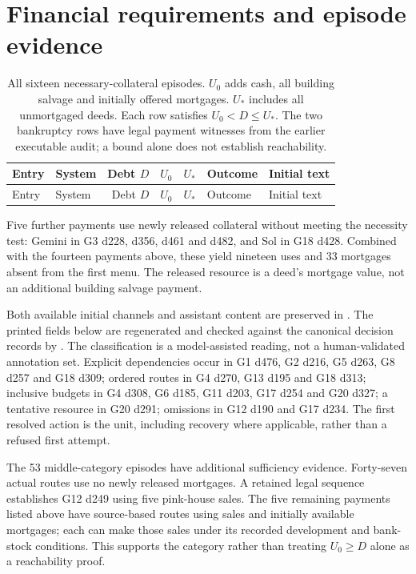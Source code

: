 \section{Financial requirements and episode evidence}
\label{app:finance}
\begin{longtable}{@{}llrrrll@{}}
\caption{All sixteen necessary-collateral episodes. $U_0$ adds cash, all building salvage and initially offered mortgages. $U_*$ includes all unmortgaged deeds. Each row satisfies $U_0<D\leq U_*$. The two bankruptcy rows have legal payment witnesses from the earlier executable audit; a bound alone does not establish reachability.}\label{tab:necessary}\\
\toprule Entry & System & Debt $D$ & $U_0$ & $U_*$ & Outcome & Initial text\\\midrule\endfirsthead
\toprule Entry & System & Debt $D$ & $U_0$ & $U_*$ & Outcome & Initial text\\\midrule\endhead

\end{longtable}

Five further payments use newly released collateral without meeting the necessity test: Gemini in G3 d228, d356, d461 and d482, and Sol in G18 d428. Combined with the fourteen payments above, these yield nineteen uses and 33 mortgages absent from the first menu. The released resource is a deed's mortgage value, not an additional building salvage payment.

Both available initial channels and assistant content are preserved in . The printed fields below are regenerated and checked against the canonical decision records by . The classification is a model-assisted reading, not a human-validated annotation set. Explicit dependencies occur in G1 d476, G2 d216, G5 d263, G8 d257 and G18 d309; ordered routes in G4 d270, G13 d195 and G18 d313; inclusive budgets in G4 d308, G6 d185, G11 d203, G17 d254 and G20 d327; a tentative resource in G20 d291; omissions in G12 d190 and G17 d234. The first resolved action is the unit, including recovery where applicable, rather than a refused first attempt.

The 53 middle-category episodes have additional sufficiency evidence. Forty-seven actual routes use no newly released mortgages. A retained legal sequence establishes G12 d249 using five pink-house sales. The five remaining payments listed above have source-based routes using sales and initially available mortgages; each can make those sales under its recorded development and bank-stock conditions. This supports the category rather than treating $U_0\geq D$ alone as a reachability proof.

